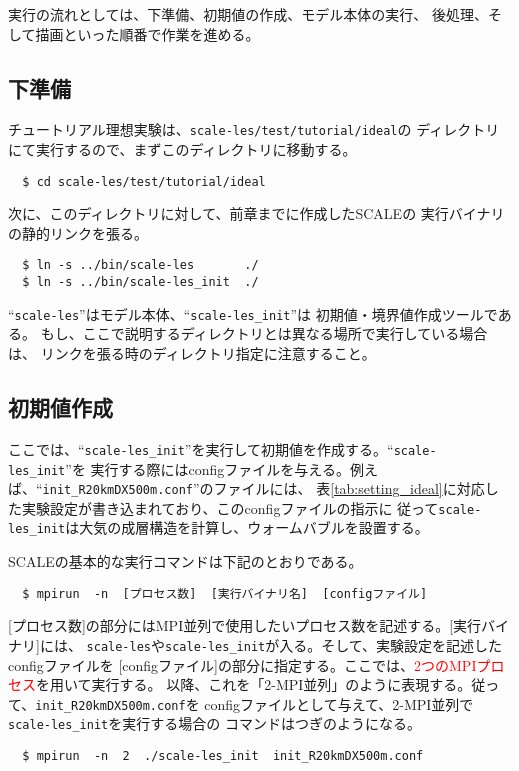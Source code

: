 実行の流れとしては、下準備、初期値の作成、モデル本体の実行、
後処理、そして描画といった順番で作業を進める。

\subsection{下準備}
チュートリアル理想実験は、\verb|scale-les/test/tutorial/ideal|の
ディレクトリにて実行するので、まずこのディレクトリに移動する。
\begin{verbatim}
  $ cd scale-les/test/tutorial/ideal
\end{verbatim}
次に、このディレクトリに対して、前章までに作成したSCALEの
実行バイナリの静的リンクを張る。
\begin{verbatim}
  $ ln -s ../bin/scale-les       ./
  $ ln -s ../bin/scale-les_init  ./
\end{verbatim}
``\verb|scale-les|''はモデル本体、``\verb|scale-les_init|''は
初期値・境界値作成ツールである。
もし、ここで説明するディレクトリとは異なる場所で実行している場合は、
リンクを張る時のディレクトリ指定に注意すること。

\subsection{初期値作成}
ここでは、``\verb|scale-les_init|''を実行して初期値を作成する。``\verb|scale-les_init|''を
実行する際にはconfigファイルを与える。例えば、``\verb|init_R20kmDX500m.conf|''のファイルには、
表\ref{tab:setting_ideal}に対応した実験設定が書き込まれており、このconfigファイルの指示に
従って\verb|scale-les_init|は大気の成層構造を計算し、ウォームバブルを設置する。


SCALEの基本的な実行コマンドは下記のとおりである。
\begin{verbatim}
  $ mpirun  -n  [プロセス数]  [実行バイナリ名]  [configファイル]
\end{verbatim}
[プロセス数]の部分にはMPI並列で使用したいプロセス数を記述する。[実行バイナリ]には、
\verb|scale-les|や\verb|scale-les_init|が入る。そして、実験設定を記述したconfigファイルを
[configファイル]の部分に指定する。ここでは、\textcolor{red}{2つのMPIプロセス}を用いて実行する。
以降、これを「2-MPI並列」のように表現する。従って、\verb|init_R20kmDX500m.conf|を
configファイルとして与えて、2-MPI並列で\verb|scale-les_init|を実行する場合の
コマンドはつぎのようになる。
\begin{verbatim}
  $ mpirun  -n  2  ./scale-les_init  init_R20kmDX500m.conf
\end{verbatim}


